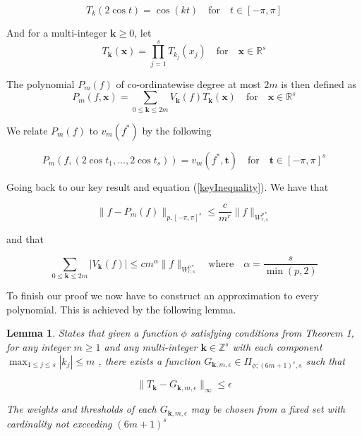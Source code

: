 \documentclass[11pt,a4paper]{article}
\theoremstyle{plain}
\newtheorem{lemma}[theorem]{Lemma}
\theoremstyle{definition}
\theoremstyle{remark}
\numberwithin{equation}{section}
\begin{document}
\begin{equation}
    T_{k}(2\cos t) = \cos(kt) \quad \text{for} \quad t \in [-\pi ,\pi ]
\end{equation}

And for a multi-integer \(\mathbf{k} \geq 0\), let 
\begin{equation}
    T_{\mathbf{k}}(\mathbf{x}) = \prod_{j=1}^{s} T_{k_{j}}(x_{j}) \quad \text{for} \quad \mathbf{x} \in \mathbb{R}^{s}
\end{equation}

The polynomial \(P_{m}(f)\) of co-ordinatewise degree at most \(2m\) is then defined as
\begin{equation}
    P_{m}(f, \mathbf{x}) = \sum_{0 \leq \mathbf{k} \leq 2m} V_{\mathbf{k}}(f) T_{\mathbf{k}}(\mathbf{x}) \quad \text{for} \quad \mathbf{x} \in \mathbb{R}^{s}  
\end{equation}

We relate \(P_{m}(f)\) to \(v_{m}(f^{\ast})\) by the following

\begin{equation}
    P_{m}(f, (2\cos t_1, ..., 2\cos t_s)) = v_{m}(f^{\ast}, \mathbf{t}) \quad \text{for} \quad \mathbf{t} \in [-\pi ,\pi ]^s
\end{equation}

Going back to our key result and equation (\ref{keyInequality}). We have that

\begin{equation}
    \|f - P_{m}(f)\|_{p,[-\pi,\pi]^s} \leq \frac{c}{m^r} \|f\|_{W^{p*}_{r,s}}
\end{equation}

and that 

\begin{equation}
    \sum_{0 \leq \mathbf{k} \leq 2m} |V_{\mathbf{k}}(f)| \leq cm^{\alpha} \|f\|_{W^{p*}_{r,s}}  \quad \text{where} \quad \alpha = \frac{s}{\min(p,2)}  
\end{equation}

To finish our proof we now have to construct an approximation to every polynomial. This is achieved by the following lemma.

\begin{lemma}
    States that given a function \(\phi\) satisfying conditions from Theorem 1, for any integer \(m \geq 1\) and any multi-integer \(\mathbf{k} \in \mathbb{Z}^{s} \) with each component \(\mathop{\max}_{1 \leq j \leq s} |k_{j}| \leq m\) , there exists a function \(G_{\mathbf{k} ,m ,\epsilon} \in \Pi_{\phi ; (6m +1)^s, s}\) such that 

    \begin{equation}
        \|T_{\mathbf{k}} - G_{\mathbf{k} ,m ,\epsilon}\|_{\infty} \leq \epsilon
    \end{equation}
    
    The weights and thresholds of each \(G_{\mathbf{k} ,m,\epsilon }\) may be chosen from a fixed set with cardinality not exceeding \((6m  +1)^s\) 
\end{lemma}
\end{document}
